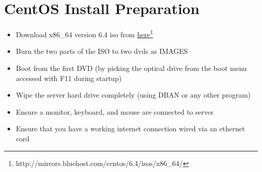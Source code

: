\section{CentOS Install Preparation}
\begin{itemize}
\item{Download x86\_64 version 6.4 iso from \href{http://mirrors.bluehost.com/centos/6.4/isos/x86_64/ }{here}}\footnote{http://mirrors.bluehost.com/centos/6.4/isos/x86\_64/}
\item{Burn the two parts of the ISO to two dvds as IMAGES}
\item{Boot from the first DVD (by picking the optical drive from the boot menu accessed with F11 during startup)}
\item{Wipe the server hard drive completely (using DBAN or any other program)}
\item{Ensure a monitor, keyboard, and mouse are connected to server}
\item{Ensure that you have a working internet connection wired via an ethernet cord}
\end{itemize}
\newpage